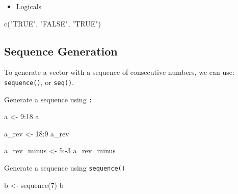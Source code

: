 \documentclass[
  letterpaper,
  DIV=11,
  numbers=noendperiod]{scrreprt}
\newenvironment{Shaded}{}{}
\newcommand{\DecValTok}[1]{\textcolor[rgb]{0.00,0.36,0.77}{#1}}
\newcommand{\FunctionTok}[1]{\textcolor[rgb]{0.44,0.26,0.76}{#1}}
\newcommand{\NormalTok}[1]{\textcolor[rgb]{0.14,0.16,0.18}{#1}}
\newcommand{\OtherTok}[1]{\textcolor[rgb]{0.44,0.26,0.76}{#1}}
\newcommand{\SpecialCharTok}[1]{\textcolor[rgb]{0.00,0.36,0.77}{#1}}
\newcommand{\StringTok}[1]{\textcolor[rgb]{0.01,0.18,0.38}{#1}}
\providecommand{\tightlist}{%
  \setlength{\itemsep}{0pt}\setlength{\parskip}{0pt}}\usepackage{longtable,booktabs,array}
\begin{document}
\begin{itemize}
\tightlist
\item
  Logicals
\end{itemize}

\begin{Shaded}
\begin{Highlighting}[]
\FunctionTok{c}\NormalTok{(}\StringTok{"TRUE"}\NormalTok{, }\StringTok{"FALSE"}\NormalTok{, }\StringTok{"TRUE"}\NormalTok{)}
\end{Highlighting}
\end{Shaded}

\subsection{Sequence Generation}\label{sequence-generation}

To generate a vector with a sequence of consecutive numbers, we can use:
\texttt{sequence()}, or \texttt{seq()}.

Generate a sequence using \texttt{:}

\begin{Shaded}
\begin{Highlighting}[]
\NormalTok{a }\OtherTok{\textless{}{-}} \DecValTok{9}\SpecialCharTok{:}\DecValTok{18}
\NormalTok{a}
\end{Highlighting}
\end{Shaded}

\begin{Shaded}
\begin{Highlighting}[]
\NormalTok{a\_rev }\OtherTok{\textless{}{-}} \DecValTok{18}\SpecialCharTok{:}\DecValTok{9}
\NormalTok{a\_rev}
\end{Highlighting}
\end{Shaded}

\begin{Shaded}
\begin{Highlighting}[]
\NormalTok{a\_rev\_minus }\OtherTok{\textless{}{-}} \DecValTok{5}\SpecialCharTok{:{-}}\DecValTok{3}
\NormalTok{a\_rev\_minus}
\end{Highlighting}
\end{Shaded}

Generate a sequence using \texttt{sequence()}

\begin{Shaded}
\begin{Highlighting}[]
\NormalTok{b }\OtherTok{\textless{}{-}} \FunctionTok{sequence}\NormalTok{(}\DecValTok{7}\NormalTok{)}
\NormalTok{b}
\end{Highlighting}
\end{Shaded}
\end{document}
